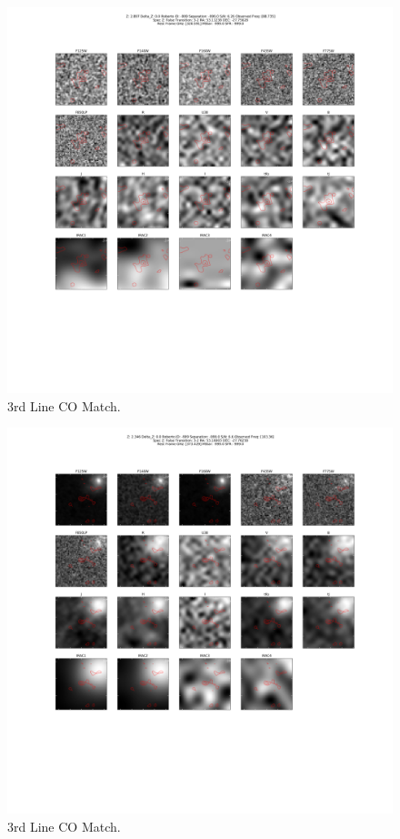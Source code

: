 \begin{figure}[tbp]
\centering \includegraphics[width=120mm]{Matched/ASPECS_Cutout_17.png}
\caption{3rd Line CO Match.}
\label{fig:Match_Three}
\end{figure}

\begin{figure}[tbp]
\centering \includegraphics[width=120mm]{Matched/ASPECS_Cutout_18.png}
\caption{3rd Line CO Match.}
\label{fig:Match_Three}
\end{figure}

